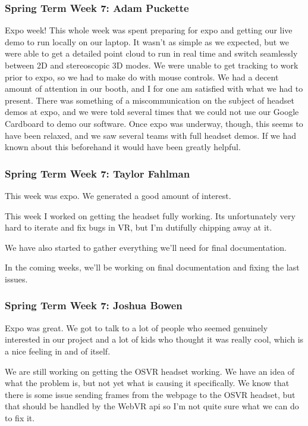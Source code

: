 \documentclass[draftclsnofoot,onecolumn]{IEEEtran}
\begin{document}
\subsubsection{Spring Term Week 7: Adam Puckette}

Expo week! This whole week was spent preparing for expo and getting our live demo to run locally on our laptop. It wasn't as simple as we expected, but we were able to get a detailed point cloud to run in real time and switch seamlessly between 2D and stereoscopic 3D modes. We were unable to get tracking to work prior to expo, so we had to make do with mouse controls. We had a decent amount of attention in our booth, and I for one am satisfied with what we had to present. There was something of a miscommunication on the subject of headset demos at expo, and we were told several times that we could not use our Google Cardboard to demo our software. Once expo was underway, though, this seems to have been relaxed, and we saw several teams with full headset demos. If we had known about this beforehand it would have been greatly helpful.

\subsubsection{Spring Term Week 7: Taylor Fahlman}

This week was expo. We generated a good amount of interest.

This week I worked on getting the headset fully working. Its unfortunately very hard to iterate and fix bugs in VR, but I'm dutifully chipping away at it.

We have also started to gather everything we'll need for final documentation.

In the coming weeks, we'll be working on final documentation and fixing the last issues.

\subsubsection{Spring Term Week 7: Joshua Bowen}

Expo was great. We got to talk to a lot of people who seemed genuinely interested in our project and a lot of kids who thought it was really cool, which is a nice feeling in and of itself.

We are still working on getting the OSVR headset working. We have an idea of what the problem is, but not yet what is causing it specifically. We know that there is some issue sending frames from the webpage to the OSVR headset, but that should be handled by the WebVR api so I'm not quite sure what we can do to fix it.
\end{document}
